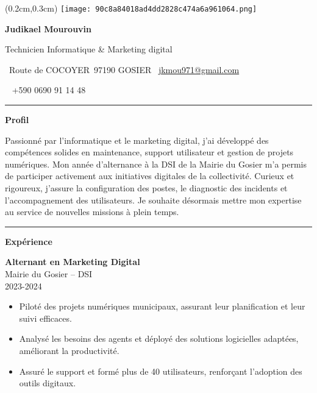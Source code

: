 \documentclass[a4paper]{article}
\renewcommand{\colorbox}[2]{#2}%
\newcommand{\fullrule}{\hspace{-1.5cm}\rule{\paperwidth}{0.4pt}}
\newcommand{\cvsection}[1]{%
  \vspace{6pt}\textbf{\Large #1}\par\vspace{2pt}}
\begin{document}
\color{white}
\begin{textblock*}{4cm}(0.2cm,0.3cm)
  \texttt{[image: 90c8a84018ad4dd2828c474a6a961064.png]}
\end{textblock*}

\begin{center}
  {\fontsize{44pt}{24pt}\selectfont\bfseries Judikael Mourouvin}

  \bigskip
  {\Large Technicien Informatique \& Marketing digital}

  \bigskip\bigskip
  \faMapMarker~Route de COCOYER\ 97190 GOSIER
  \quad\faEnvelope~\href{mailto:jkmou971@gmail.com}{jkmou971@gmail.com}

  \bigskip
  \faPhone~ +590 0690 91 14 48
  \quad \faLinkedin\ \href{}{}
 

  \vspace{-0.3cm}
  \medskip\fullrule
\end{center}

\cvsection{Profil}

Passionné par l’informatique et le marketing digital, j’ai développé des compétences solides en maintenance, support utilisateur et gestion de projets numériques. Mon année d’alternance à la DSI de la Mairie du Gosier m’a permis de participer activement aux initiatives digitales de la collectivité. Curieux et rigoureux, j’assure la configuration des postes, le diagnostic des incidents et l’accompagnement des utilisateurs. Je souhaite désormais mettre mon expertise au service de nouvelles missions à plein temps.

\medskip\fullrule

\cvsection{Expérience}
\hspace*{1.3cm}%

\colorbox{maincolor}{%
  \begin{minipage}{\linewidth}
    \textbf{Alternant en Marketing Digital} \\ Mairie du Gosier – DSI \\ 2023-2024
    \begin{itemize}
      \item Piloté des projets numériques municipaux, assurant leur planification et leur suivi efficaces. \item Analysé les besoins des agents et déployé des solutions logicielles adaptées, améliorant la productivité. \item Assuré le support et formé plus de 40 utilisateurs, renforçant l’adoption des outils digitaux.
    \end{itemize}
  \end{minipage}}
\end{document}
